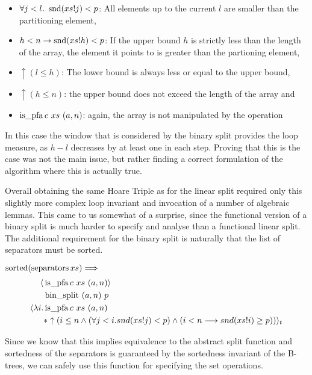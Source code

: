 \begin{itemize}
    \item $\forall j<l.\ \operatorname{snd} (xs!j) < p$: All elements up to the current $l$
        are smaller than the partitioning element,
    \item $h<n \rightarrow \operatorname{snd} (xs!h) < p$: If the upper bound $h$
    is strictly less than the length of the array,
    the element it points to is greater than the partioning element,
    \item $\uparrow(l \leq h)$: The lower bound is always less or equal to the upper bound,
    \item $\uparrow(h \leq n)$: the upper bound does not exceed the length of the array and
    \item $\operatorname{is\_pfa} c\ xs\ (a,n)$: again, the array is not manipulated by the operation
\end{itemize}

In this case the window that is considered by the binary split
provides the loop measure, as $h-l$ decreases by at least one in each step.
Proving that this is the case was not the main issue,
but rather finding a correct formulation of the algorithm
where this is actually true.

Overall obtaining the same Hoare Triple
as for the linear split required only
this slightly more complex loop invariant
and invocation of a number of algebraic lemmas.
This came to us somewhat of a surprise, since the functional
version of a binary split is much harder to
specify and analyse than a functional linear split.
The additional requirement for the binary split is
naturally that the list of separators must be sorted.

\begin{lemma} $\operatorname{sorted} (\operatorname{separators} xs) \Longrightarrow$ \\
    \label{lem:imp-bin-split-ht}
    \begin{align*}
        \langle &\operatorname{is\_pfa} c\ xs\ (a,n)\rangle \\
                  &\operatorname{bin\_split}\ (a,n)\ p \\
        \langle \lambda i. & \operatorname{is\_pfa} c\ xs\ (a,n)\\
        &* \uparrow(i \leq n 
            \wedge (\forall j < i. snd (xs!j) < p) 
            \wedge (i<n \longrightarrow snd (xs!i) \geq p)) \rangle_t 
    \end{align*}
\end{lemma}

Since we know that this implies equivalence to the abstract split function
and sortedness of the separators is guaranteed by the sortedness
invariant of the B-trees,
we can safely use this function for specifying
the set operations.

